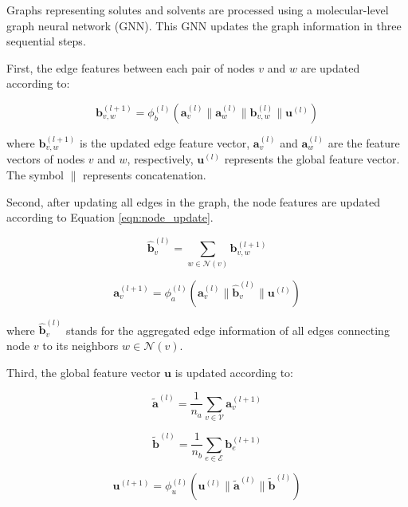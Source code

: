 Graphs representing solutes and solvents are processed using a molecular-level graph neural network (GNN). This GNN updates the graph information in three sequential steps. 

First, the edge features between each pair of nodes $v$ and $w$ are updated according to:

\begin{equation}
\label{eqn:edge_update}
\mathbf{b}_{v,w}^{(l+1)} = \phi_b^{(l)}
\left(
\mathbf{a}_{v}^{(l)} \parallel \mathbf{a}_{w}^{(l)} \parallel \mathbf{b}_{v,w}^{(l)} \parallel \mathbf{u}^{(l)}
\right)
\end{equation}

\noindent where $\mathbf{b}_{v,w}^{(l+1)}$ is the updated edge feature vector, $\mathbf{a}_v^{(l)}$ and $\mathbf{a}_w^{(l)}$ are the feature vectors of nodes $v$ and $w$, respectively, $\mathbf{u}^{(l)}$ represents the global feature vector. The symbol $\parallel$ represents concatenation.

Second, after updating all edges in the graph, the node features are updated according to Equation \ref{eqn:node_update}.

\begin{equation}
   \widehat{\mathbf{b}}_{v}^{(l)} = \sum_{w \in \mathcal{N}(v)} \mathbf{b}_{v,w}^{(l+1)}
\end{equation}

\begin{equation}
\label{eqn:node_update}
   \mathbf{a}_v^{(l+1)} = \phi_a^{(l)}  
   \left( 
        \mathbf{a}_{v}^{(l)} \parallel \widehat{\mathbf{b}}_{v}^{(l)} \parallel \mathbf{u}^{(l)}
   \right)
\end{equation}

\noindent where $\widehat{\mathbf{b}}_{v}^{(l)}$ stands for the aggregated edge information of all edges connecting node $v$ to its neighbors $w \in \mathcal{N}(v)$.

Third, the global feature vector $\mathbf{u}$ is updated according to:

\begin{equation}
   \widetilde{\mathbf{a}}^{(l)} = \frac{1}{n_a} \sum_{v \in \mathcal{V}} \mathbf{a}_v^{(l+1)}
\end{equation}

\begin{equation}
   \widetilde{\mathbf{b}}^{(l)} = \frac{1}{n_b} \sum_{e \in \mathcal{E}} \mathbf{b}_{e}^{(l+1)}
\end{equation}

\begin{equation}
\label{eqn:global_update}
   \mathbf{u}^{(l+1)} = \phi_u^{(l)}  
   \left( 
        \mathbf{u}^{(l)} \parallel \widetilde{\mathbf{a}}^{(l)} \parallel \widetilde{\mathbf{b}}^{(l)}
   \right)
\end{equation}

